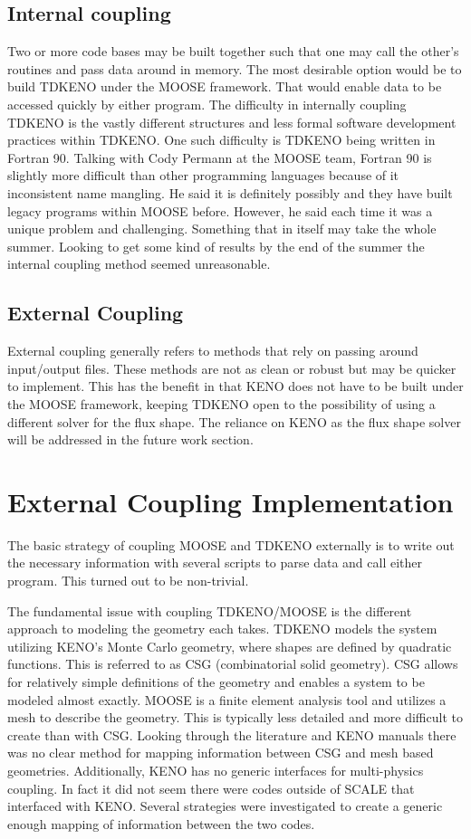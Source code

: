 \documentclass[11pt]{article}
\begin{document}
\subsection{Internal coupling}
 Two or more code bases may be built together such that one may call the other's routines and pass data around in memory.  The most desirable option would be to build TDKENO under the MOOSE framework.  That would enable data to be accessed quickly by either program.  The difficulty in internally coupling TDKENO is the vastly different structures and less formal software development practices within TDKENO.  One such difficulty is TDKENO being written in Fortran 90.  Talking with Cody Permann at the MOOSE team, Fortran 90 is slightly more difficult than other programming languages because of it inconsistent name mangling.  He said it is definitely possibly and they have built legacy programs within MOOSE before.  However, he said each time it was a unique problem and challenging.  Something that in itself may take the whole summer.  Looking to get some kind of results by the end of the summer the internal coupling method seemed unreasonable. 

\subsection{External Coupling}
External coupling generally refers to methods that rely on passing around input/output files.  These methods are not as clean or robust but may be quicker to implement. This has the benefit in that KENO does not have to be built under the MOOSE framework, keeping TDKENO open to the possibility of using a different solver for the flux shape.  The reliance on KENO as the flux shape solver will be addressed in the future work section. 

\section{External Coupling Implementation }

The basic strategy of coupling MOOSE and TDKENO externally is to write out the necessary information with several scripts to parse data and call either program. This turned out to be non-trivial. 

The fundamental issue with coupling TDKENO/MOOSE is the different approach to modeling the geometry each takes.  TDKENO models the system utilizing KENO's Monte Carlo geometry, where shapes are defined by quadratic functions. This is referred to as CSG (combinatorial solid geometry). CSG allows for relatively simple definitions of the geometry and enables a system to be modeled almost exactly. MOOSE is a finite element analysis tool and utilizes a mesh to describe the geometry.  This is typically less detailed and more difficult to create than with CSG.  Looking through the literature and KENO manuals there was no clear method for mapping information between CSG and mesh based geometries.  Additionally, KENO has no generic interfaces for multi-physics coupling.  In fact it did not seem there were codes outside of SCALE that interfaced with KENO.  Several strategies were investigated to create a generic enough mapping of information between the two codes. 
\end{document}
